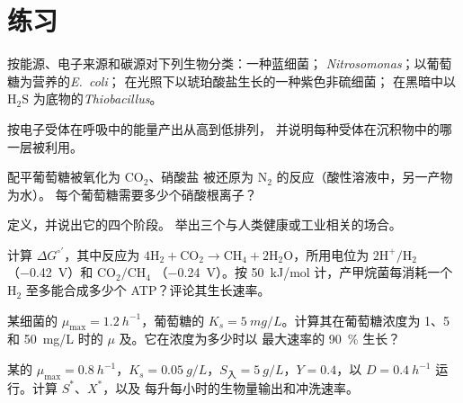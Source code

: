 \section{练习}

\begin{exercise}[$\star$]\label{exo:b2:microbial-metabolism:1}
按能源、电子来源和碳源对下列生物分类：一种蓝细菌；
\emph{Nitrosomonas}；以葡萄糖为营养的\emph{E.~coli}；
在光照下以琥珀酸盐生长的一种紫色非硫细菌；
在黑暗中以 $\mathrm{H_2S}$ 为底物的\emph{Thiobacillus}。
\end{exercise}

\begin{exercise}[$\star$]\label{exo:b2:microbial-metabolism:2}
按电子受体在呼吸中的能量产出从高到低排列，
并说明每种受体在沉积物中的哪一层被利用。
\end{exercise}

\begin{exercise}[$\star$]\label{exo:b2:microbial-metabolism:3}
配平葡萄糖被氧化为 $\mathrm{CO_2}$、硝酸盐
被还原为 $\mathrm{N_2}$ 的反应（酸性溶液中，另一产物为水）。
每个葡萄糖需要多少个硝酸根离子？
\end{exercise}

\begin{exercise}[$\star$]\label{exo:b2:microbial-metabolism:4}
定义，并说出它的四个阶段。
举出三个与人类健康或工业相关的场合。
\end{exercise}

\begin{exercise}[$\star\star$]\label{exo:b2:microbial-metabolism:5}
计算 $\Delta G^{\circ\prime}$，其中反应为 $4\mathrm{H_2} + \mathrm{CO_2}
\to \mathrm{CH_4} + 2\mathrm{H_2O}$，所用电位为
$\mathrm{2H^+/H_2}$（\qty{-0.42}{V}）和 $\mathrm{CO_2/CH_4}$
（\qty{-0.24}{V}）。按 \qty{50}{kJ/mol} 计，产甲烷菌每消耗一个 $\mathrm{H_2}$
至多能合成多少个 ATP？评论其生长速率。
\end{exercise}

\begin{exercise}[$\star\star$]\label{exo:b2:microbial-metabolism:6}
某细菌的 $\mu_{\max} = \qty{1.2}{h^{-1}}$，葡萄糖的 $K_s =
\qty{5}{mg/L}$。计算其在葡萄糖浓度为
1、5 和 \qty{50}{mg/L} 时的 $\mu$ 及。它在浓度为多少时以
最大速率的 \qty{90}{\%} 生长？
\end{exercise}

\begin{exercise}[$\star\star$]\label{exo:b2:microbial-metabolism:7}
某的 $\mu_{\max} = \qty{0.8}{h^{-1}}$，$K_s =
\qty{0.05}{g/L}$，$S_{\text{入}} = \qty{5}{g/L}$，$Y = 0.4$，以
$D = \qty{0.4}{h^{-1}}$ 运行。计算 $S^*$、$X^*$，以及
每升每小时的生物量输出和冲洗速率。
\end{exercise}

